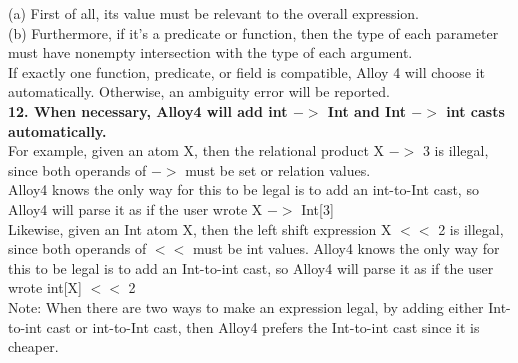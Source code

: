 \documentclass[a4paper,12pt]{extarticle}
\begin{document}
(a) First of all, its value must be relevant to the overall expression. \\
(b) Furthermore, if it's a predicate or function, then the type of each parameter must have nonempty intersection with the type of each argument. \\
If exactly one function, predicate, or field is compatible, Alloy 4 will choose it automatically. Otherwise, an ambiguity error will be reported. \\
\textbf{12. When necessary, Alloy4 will add int $->$ Int and Int $->$ int casts automatically. } \\
For example, given an atom X, then the relational product X $->$ 3 is illegal,\\
since both operands of $->$ must be set or relation values.\\
Alloy4 knows the only way for this to be legal is to add an int-to-Int cast,
so Alloy4 will parse it as if the user wrote X $->$ Int[3] \\
  Likewise, given an Int atom X, then the left shift expression X $<<$ 2 is illegal,
since both operands of $<<$ must be int values.
Alloy4 knows the only way for this to be legal is to add an Int-to-int cast,
so Alloy4 will parse it as if the user wrote int[X] $<<$ 2 \\

  Note: When there are two ways to make an expression legal,
by adding either Int-to-int cast or int-to-Int cast,
then Alloy4 prefers the Int-to-int cast since it is cheaper. \\
  
\end{document}
